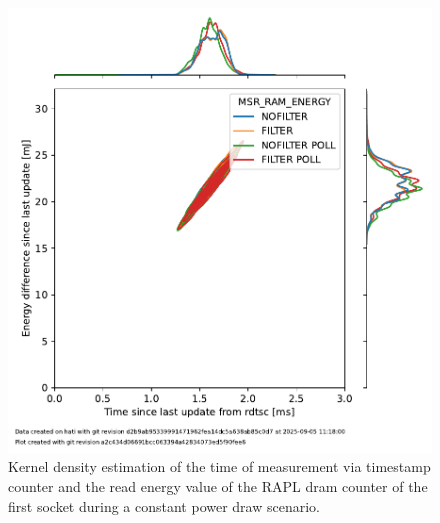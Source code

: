 \begin{figure}[]
    \centering
    \includegraphics[width=\columnwidth]{fig/rapl-update-intervals/MSR_RAM_ENERGY_2000000.pdf}
    \caption{\label{fig:rapl-update-intervals-dram}Kernel density estimation of the time of measurement via timestamp counter and the read energy value of the RAPL dram counter of the first socket during a constant power draw scenario.}
\end{figure}